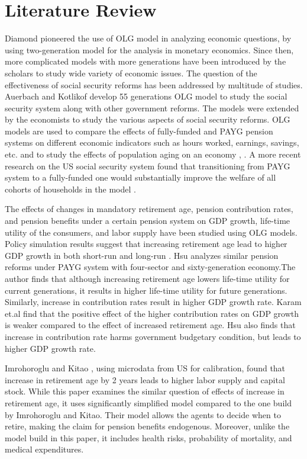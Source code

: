 \documentclass[ProjectUYA]{subfiles}
\begin{document}
\section{Literature Review}
Diamond \cite{diamond} pioneered the use of OLG model in analyzing economic questions, by using two-generation model for the analysis in monetary economics. Since then, more complicated models with more generations have been introduced by the scholars to study wide variety of economic issues. The question of the effectiveness of social security reforms has been addressed by multitude of studies. Auerbach and Kotlikof \cite{auerbach} develop 55 generations OLG model to study the social security system along with other government reforms. The models were extended by the economists to study the various aspects of social security reforms. OLG models are used to compare the effects of fully-funded and PAYG pension systems on different economic indicators such as hours worked, earnings, savings, etc. \cite{buyse} and to study the effects of population aging on an economy \cite{muto}, \cite{heijdra}. A more recent research on the US social security system found that transitioning from PAYG system to a fully-funded one would substantially improve the welfare of all cohorts of households in the model \cite{mcgrattan}.

The effects of changes in mandatory retirement age, pension contribution rates, and pension benefits under a certain pension system on GDP growth, life-time utility of the consumers, and labor supply have been studied using OLG models. Policy simulation results suggest that increasing retirement age lead to higher GDP growth in both short-run and long-run \cite{cournede}.  Hsu \cite{hsu} analyzes similar pension reforms under PAYG system with four-sector and sixty-generation economy.The author finds that although increasing retirement age lowers life-time utility for current generations, it results in higher life-time utility for future generations. Similarly, increase in contribution rates result in higher GDP growth rate. Karam et.al \cite{karam} find that the positive effect of the higher contribution rates on GDP growth is weaker compared to the effect of increased retirement age. Hsu \cite{hsu} also finds that increase in contribution rate harms government budgetary condition, but leads to higher GDP growth rate.

Imrohoroglu and Kitao \cite{imroh}, using microdata from US for calibration, found that increase in retirement age by 2 years leads to higher labor supply and capital stock. While this paper examines the similar question of effects of increase in retirement age, it uses significantly simplified model compared to the one build by Imrohoroglu and Kitao. Their model allows the agents to decide when to retire, making the claim for pension benefits endogenous. Moreover, unlike the model build in this paper, it includes health risks, probability of mortality, and medical expenditures.
\end{document}
